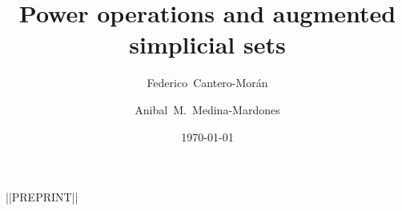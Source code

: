 \documentclass{amsart}
\title{Power operations and augmented simplicial sets}
\author[Cantero-Mor\'an]{Federico~Cantero-Mor\'an}
\author[Medina-Mardones]{Anibal~M.~Medina-Mardones}
\date{\today}
\begin{document}
	\begin{center}
		||PREPRINT||
		\vskip 20pt
	\end{center}
	
	\maketitle
	\tableofcontents
 \newpage
	
	
	
	
	
	
	
	
	
	\sloppy
	\printbibliography
%

	\newpage
	\todos
\end{document}
